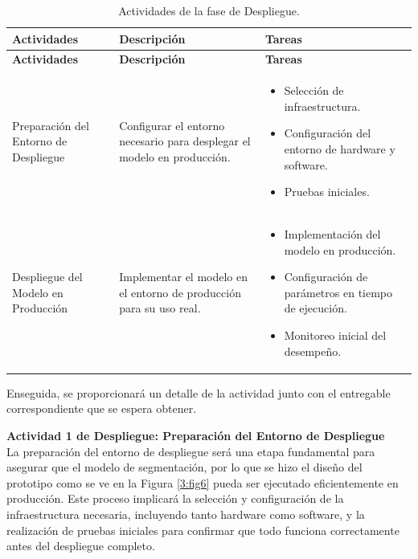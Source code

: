\vspace{2ex}
 \begingroup
 \renewcommand\arraystretch{1.2}
 \begin{longtable}{>{\raggedright\arraybackslash}p{4cm} >{\raggedright\arraybackslash}p{4cm} >{\raggedright\arraybackslash}p{5cm}}
 \caption{Actividades de la fase de Despliegue.}
 \label{tabla:despliegue}\\
 \toprule
 \textbf{Actividades} & \textbf{Descripción} & \textbf{Tareas} \\
 \midrule
 \endfirsthead
 
 \toprule
 \textbf{Actividades} & \textbf{Descripción} & \textbf{Tareas} \\
 \midrule
 \endhead
 
 \bottomrule
 \endfoot
 
 Preparación del Entorno de Despliegue & Configurar el entorno necesario para desplegar el modelo en producción. & 
    \begin{itemize}
        \item Selección de infraestructura.
        \item Configuración del entorno de hardware y software.
        \item Pruebas iniciales.
    \end{itemize} \\
 
 Despliegue del Modelo en Producción & Implementar el modelo en el entorno de producción para su uso real. & 
 \begin{itemize}
     \item Implementación del modelo en producción.
     \item Configuración de parámetros en tiempo de ejecución.
     \item Monitoreo inicial del desempeño.
 \end{itemize} \\
 \end{longtable}
 \endgroup

 Enseguida, se proporcionará un detalle de la actividad junto con el entregable correspondiente que se espera obtener.

\textbf{Actividad 1 de Despliegue: Preparación del Entorno de Despliegue}
\\
La preparación del entorno de despliegue será una etapa fundamental para asegurar que el modelo de segmentación, por lo que se hizo el diseño del prototipo como se ve en la Figura \ref{3:fig6} pueda ser ejecutado eficientemente en producción. Este proceso implicará la selección y configuración de la infraestructura necesaria, incluyendo tanto hardware como software, y la realización de pruebas iniciales para confirmar que todo funciona correctamente antes del despliegue completo.

